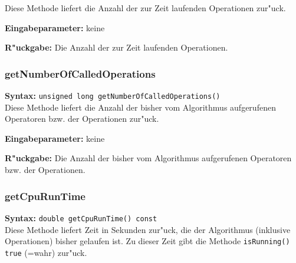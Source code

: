 Diese Methode liefert die Anzahl der zur Zeit laufenden Operationen zur"uck.

\bigskip\noindent
\textbf{Eingabeparameter:} keine

\bigskip\noindent
\textbf{R"uckgabe:} Die Anzahl der zur Zeit laufenden Operationen.

%
%
%
%


\subsubsection{getNumberOfCalledOperations}

\textbf{Syntax:} \verb|unsigned long getNumberOfCalledOperations()| \\

Diese Methode liefert die Anzahl der bisher vom Algorithmus aufgerufenen Operatoren bzw. der Operationen zur"uck.

\bigskip\noindent
\textbf{Eingabeparameter:} keine

\bigskip\noindent
\textbf{R"uckgabe:} Die Anzahl der bisher vom Algorithmus aufgerufenen Operatoren bzw. der Operationen.


\subsubsection{getCpuRunTime}

\textbf{Syntax:} \verb|double getCpuRunTime() const| \\

Diese Methode liefert Zeit in Sekunden zur"uck, die der Algorithmus (inklusive Operationen) bisher gelaufen ist. Zu dieser Zeit gibt die Methode \verb|isRunning()| \verb|true| (=wahr) zur"uck.

